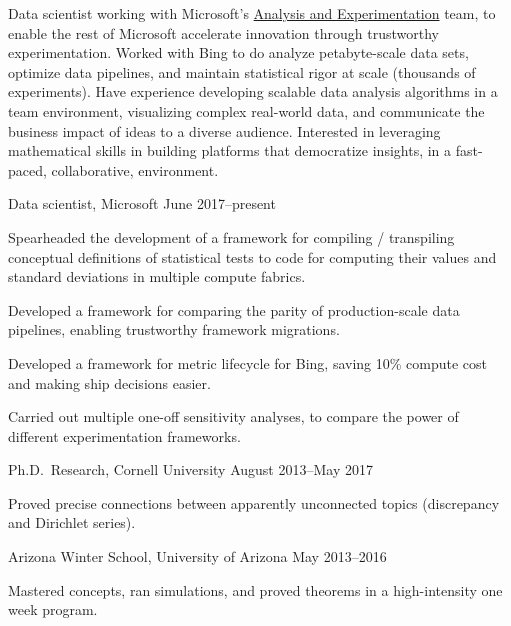 \documentclass[11pt, letterpaper]{awesome-cv}
\begin{document}
\makecvheader






\begin{cvparagraph}
Data scientist working with Microsoft's \href{http://www.exp-platform.com/}{Analysis and Experimentation} team, to enable the rest of Microsoft accelerate innovation through trustworthy experimentation. Worked with Bing to do analyze petabyte-scale data sets, optimize data pipelines, and maintain statistical rigor at scale (thousands of experiments). Have experience developing scalable data analysis algorithms in a team environment, visualizing complex real-world data, and communicate the business impact of ideas to a diverse audience. Interested in leveraging mathematical skills in building platforms that democratize insights, in a fast-paced, collaborative, environment.
\end{cvparagraph}






\begin{cventries}

\cventry
	{Data scientist, Microsoft}
	{}{}
	{June 2017--present}
	{
		\begin{cvitems}
			\item{Spearheaded the development\textbf{} of a framework for compiling / transpiling conceptual definitions of statistical tests to code for computing their values and standard deviations in multiple compute fabrics.}
			\item{Developed a framework for comparing the parity of production-scale data pipelines, enabling trustworthy framework migrations.}
			\item{Developed a framework for metric lifecycle for Bing, saving 10\% compute cost and making ship decisions easier.}
			\item{Carried out multiple one-off sensitivity analyses, to compare the power of different experimentation frameworks.}
		\end{cvitems}
	}

\cventry
	{Ph.D.~Research, Cornell University}
	{}{}
	{August 2013--May 2017}
	{
		\begin{cvitems}
			\item{Proved precise connections between apparently unconnected topics (discrepancy and Dirichlet series).}
		\end{cvitems}
	}
		
\cventry
	{Arizona Winter School, University of Arizona}
	{}{}
	{May 2013--2016}
	{
		\begin{cvitems}
			\item{Mastered concepts, ran simulations, and proved theorems in a high-intensity one week program.}
		\end{cvitems}
	}
\end{cventries}
\end{document}
